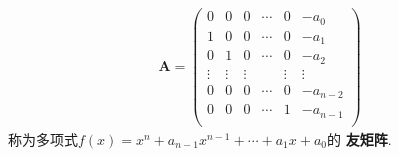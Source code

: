 \documentclass[lang=cn,newtx,10pt,scheme=chinese]{elegantbook}
\begin{document}
\begin{definition}[友矩阵]
\begin{align*}
\boldsymbol{A}=\left( \begin{matrix}
0&		0&		0&		\cdots&		0&		-a_0\\
1&		0&		0&		\cdots&		0&		-a_1\\
0&		1&		0&		\cdots&		0&		-a_2\\
\vdots&		\vdots&		\vdots&		&		\vdots&		\vdots\\
0&		0&		0&		\cdots&		0&		-a_{n-2}\\
0&		0&		0&		\cdots&		1&		-a_{n-1}\\
\end{matrix} \right) 
\end{align*}
称为多项式$f\left( x \right) =x^n+a_{n-1}x^{n-1}+\cdots +a_1x+a_0$的
\textbf{友矩阵}.
\end{definition}
\end{document}
